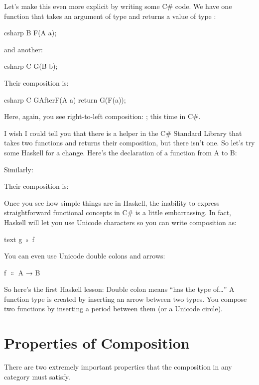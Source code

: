 Let's make this even more explicit by writing some C\# code. We have one
function  that takes an argument of type  and
returns a value of type :

\begin{snip}{csharp}
B F(A a);
\end{snip}
and another:

\begin{snip}{csharp}
C G(B b);
\end{snip}
Their composition is:

\begin{snip}{csharp}
C GAfterF(A a)
{
    return G(F(a));
}
\end{snip}
Here, again, you see right-to-left composition: ; this
time in C\#.

I wish I could tell you that there is a helper in the C\# Standard
Library that takes two functions and returns their composition, but
there isn't one. So let's try some Haskell for a change. Here's the
declaration of a function from A to B:

Similarly:

Their composition is:

Once you see how simple things are in Haskell, the inability to express
straightforward functional concepts in C\# is a little embarrassing. In
fact, Haskell will let you use Unicode characters so you can write
composition as:
\begin{snip}{text}
g ◦ f
\end{snip}

You can even use Unicode double colons and arrows:
\begin{snipv}
f \ensuremath{\Colon} A → B
\end{snipv}
So here's the first Haskell lesson: Double colon means ``has the type
of\ldots{}'' A function type is created by inserting an arrow between
two types. You compose two functions by inserting a period between them
(or a Unicode circle).

\section{Properties of Composition}

There are two extremely important properties that the composition in any
category must satisfy.

